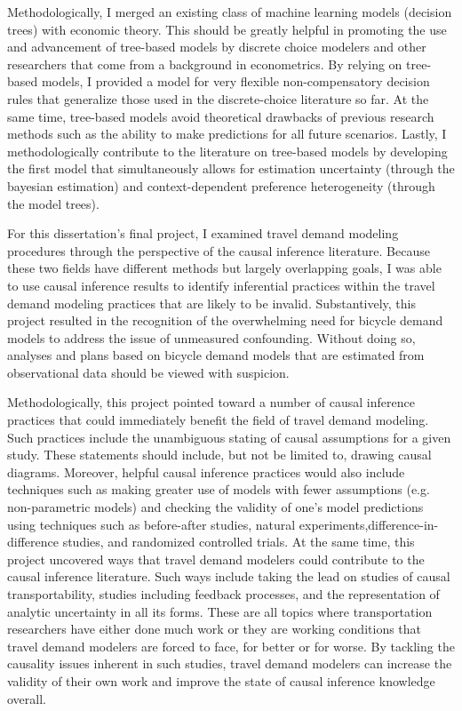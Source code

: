 Methodologically, I merged an existing class of machine learning models (decision trees) with economic theory. This should be greatly helpful in promoting the use and advancement of tree-based models by discrete choice modelers and other researchers that come from a background in econometrics. By relying on tree-based models, I provided a model for very flexible non-compensatory decision rules that generalize those used in the discrete-choice literature so far. At the same time, tree-based models avoid theoretical drawbacks of previous research methods such as the ability to make predictions for all future scenarios. Lastly, I methodologically contribute to the literature on tree-based models by developing the first model that simultaneously allows for estimation uncertainty (through the bayesian estimation) and context-dependent preference heterogeneity (through the model trees).

For this dissertation's final project, I examined travel demand modeling procedures through the perspective of the causal inference literature. Because these two fields have different methods but largely overlapping goals, I was able to use causal inference results to identify inferential practices within the travel demand modeling practices that are likely to be invalid. Substantively, this project resulted in the recognition of the overwhelming need for bicycle demand models to address the issue of unmeasured confounding. Without doing so, analyses and plans based on bicycle demand models that are estimated from observational data should be viewed with suspicion.

Methodologically, this project pointed toward a number of causal inference practices that could immediately benefit the field of travel demand modeling. Such practices include the unambiguous stating of causal assumptions for a given study. These statements should include, but not be limited to, drawing causal diagrams. Moreover, helpful causal inference practices would also include techniques such as making greater use of models with fewer assumptions (e.g. non-parametric models) and checking the validity of one's model predictions using techniques such as before-after studies, natural experiments,difference-in-difference studies, and randomized controlled trials. At the same time, this project uncovered ways that travel demand modelers could contribute to the causal inference literature. Such ways include taking the lead on studies of causal transportability, studies including feedback processes, and the representation of analytic uncertainty in all its forms. These are all topics where transportation researchers have either done much work or they are working conditions that travel demand modelers are forced to face, for better or for worse. By tackling the causality issues inherent in such studies, travel demand modelers can increase the validity of their own work and improve the state of causal inference knowledge overall.

